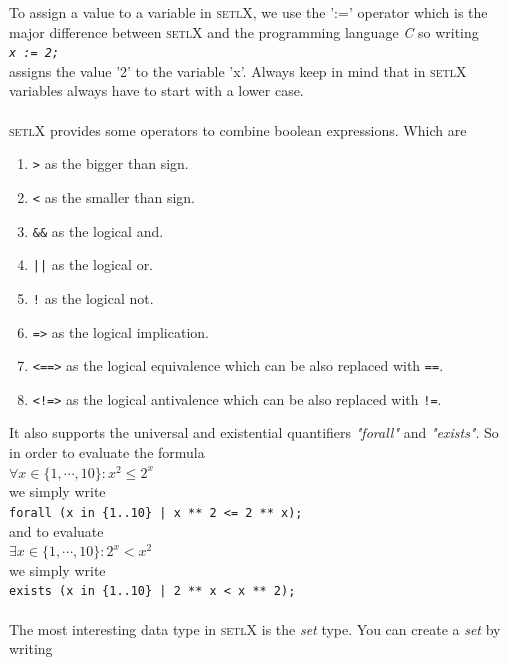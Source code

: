 \documentclass[11pt]{report}
\begin{document}
To assign a value to a variable in \textsc{setlX}, we use the ':=' operator which is the major difference between \textsc{setlX} and the programming language \textsl{C}
so writing 
\\[0.2cm]
\hspace*{1.3cm}
\texttt{\textsl{x := 2;}}
\\[0.2cm]
assigns the value '2' to the variable 'x'. Always keep in mind that in \textsc{setlX} variables always have to start with a lower case.
\\
\\
\textsc{setlX} provides some operators to combine boolean expressions. Which are
\begin{enumerate}
\item \texttt{>} as the bigger than sign.
\item \texttt{<} as the smaller than sign.
\item \texttt{\&\&} as the logical and.
\item \texttt{||} as the logical or.
\item \texttt{!} as the logical not.
\item \texttt{=>} as the logical implication.
\item \texttt{<==>} as the logical equivalence which can be also replaced with \texttt{==}.
\item \texttt{<!=>} as the logical antivalence which can be also replaced with \texttt{!=}.
\end{enumerate}
It also supports the universal and existential quantifiers \textsl{"forall"} and \textsl{"exists"}.
So in order to evaluate the formula
\\[0.2cm]
\hspace*{1.3cm}
$\forall x \in \{ 1, \cdots, 10 \}: x^2 \leq 2^x$
\\[0.2cm]
we simply write
\\[0.2cm]
\hspace*{1.3cm}
\texttt{forall (x in \{1..10\} | x ** 2 <= 2 ** x);}
\\[0.2cm]
and to evaluate
\\[0.2cm]
\hspace*{1.3cm}
$\exists x \in \{ 1, \cdots, 10 \}: 2^x < x^2$
\\[0.2cm]
we simply write
\\[0.2cm]
\hspace*{1.3cm}
\texttt{exists (x in \{1..10\} | 2 ** x < x ** 2);}
\\[0.2cm]
\\
The most interesting data type in \textsc{setlX} is the \textsl{set} type. You can create a \textsl{set} by writing
\end{document}
